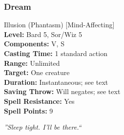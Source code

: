 \subsubsection{Dream}
\label{Spell:Dream}
Illusion (Phantasm) [Mind-Affecting]
\\ \textbf{Level:} Bard 5, Sor/Wiz 5
\\ \textbf{Components:} V, S
\\ \textbf{Casting Time:} 1 standard action
\\ \textbf{Range:} Unlimited
\\ \textbf{Target:} One creature
\\ \textbf{Duration:} Instantaneous; see text
\\ \textbf{Saving Throw:} Will negates; see text
\\ \textbf{Spell Resistance:} Yes
\\ \textbf{Spell Points:} 9

\emph{''Sleep tight. I'll be there.``}

